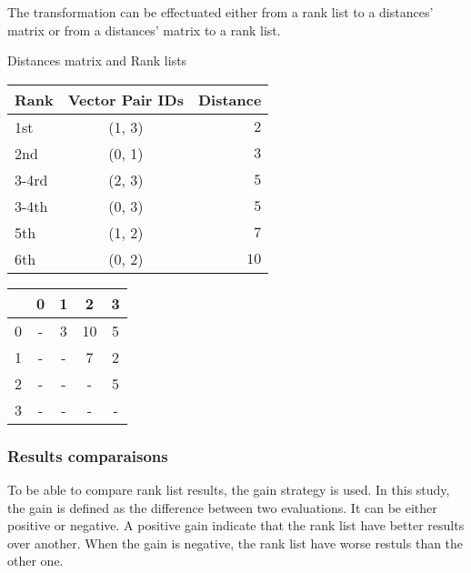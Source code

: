 The transformation can be effectuated either from a rank list to a distances' matrix or from a distances' matrix to a rank list.

\begin{example}
  \centering
  \caption{Distances matrix and Rank lists}
  \label{ex:distances_matrix}
  \begin{subexample}{\linewidth}
    \centering
    \begin{tabular}{l c r}
      \toprule
      Rank & Vector Pair IDs & Distance \\
      \midrule
      1st   & (1, 3) & $2$ \\
      2nd   & (0, 1) & $3$ \\
      3-4rd & (2, 3) & $5$ \\
      3-4th & (0, 3) & $5$ \\
      5th   & (1, 2) & $7$ \\
      6th   & (0, 2) & $10$ \\
      \bottomrule
    \end{tabular}
  \end{subexample}

  \vspace{0.5cm}

  \begin{subexample}{\linewidth}
    \centering
    \begin{tabular}{c|c c c c}
      \toprule
        & 0 & 1 & 2  & 3 \\
      \midrule
      0 & - & 3 & 10 & 5 \\
      1 & - & - & 7  & 2 \\
      2 & - & - & -  & 5 \\
      3 & - & - & -  & - \\
      \bottomrule
    \end{tabular}
  \end{subexample}
\end{example}

\subsubsection{Results comparaisons \label{sec:results_comparaison}}

To be able to compare rank list results, the gain strategy is used.
In this study, the gain is defined as the difference between two evaluations.
It can be either positive or negative.
A positive gain indicate that the rank list have better results over another.
When the gain is negative, the rank list have worse restuls than the other one.

